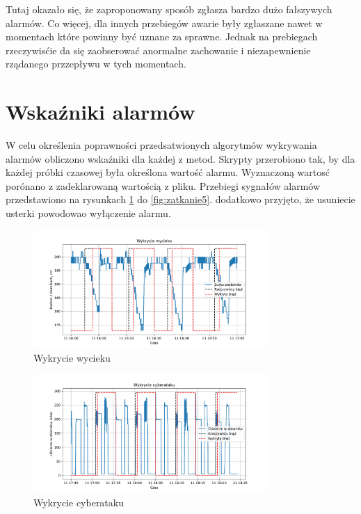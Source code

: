 \documentclass[a4paper,12pt]{article}
\begin{document}
Tutaj okazało się, że zaproponowany sposób zgłasza bardzo dużo fałszywych alarmów. Co więcej, dla innych przebiegów awarie były zgłaszane nawet w momentach które powinny być uznane za sprawne. Jednak na prebiegach rzeczywisćie da się zaobserować anormalne zachowanie i niezapewnienie rządanego przzepływu w tych momentach.

\section{Wskaźniki alarmów}

W celu określenia poprawności przedsatwionych algorytmów wykrywania alarmów obliczono wskaźniki dla każdej z metod. Skrypty przerobiono tak, by dla każdej próbki czasowej była określona wartość alarmu. Wyznaczoną wartosć porónano z zadeklarowaną wartością z pliku. Przebiegi sygnałów alarmów przedstawiono na rysunkach \ref{fig:wyciek5} do \ref{fig:zatkanie5}. dodatkowo przyjęto, że usuniecie usterki powodowao wyłączenie alarmu.

\begin{figure}[H]
        \centering
        \includegraphics[width=0.8\textwidth]{leak_detection_wskazniki.pdf}
        \caption{Wykrycie wycieku}
        \label{fig:wyciek5}
\end{figure}

\begin{figure}[H]
        \centering
        \includegraphics[width=0.8\textwidth]{attack_detection_wskazniki.pdf}
        \caption{Wykrycie cyberataku}
        \label{fig:atak5}
\end{figure}
\end{document}
